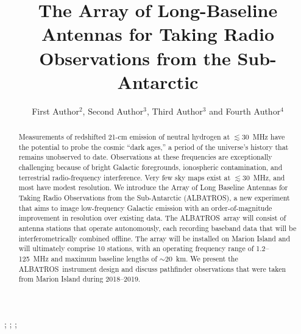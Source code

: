 \documentclass{ws-jai}
\def\albatros{ALBATROS}
\begin{document}
\catchline{}{}{}{}{} %


\title{The Array of Long-Baseline Antennas for Taking Radio
  Observations from the Sub-Antarctic}

\author{First Author$^{2}$, Second Author$^{3}$, Third Author$^{3}$ and Fourth Author$^{4}$}

\address{
$^{2}$Department, University Name, City, State ZIP/Zone, Country, fauthor@university.com\\
$^{3}$Group, Company, Address, City, State ZIP/Zone, Country\\
$^{4}$Group, Company, Address, City, State ZIP/Zone, Country, fauthor@company.com
}

\maketitle


\begin{history}
;
;
;
\end{history}

\begin{abstract}
Measurements of redshifted 21-cm emission of neutral hydrogen at
$\lesssim30$~MHz have the potential to probe the cosmic ``dark ages,''
a period of the universe's history that remains unobserved to date.
Observations at these frequencies are exceptionally challenging
because of bright Galactic foregrounds, ionospheric contamination, and
terrestrial radio-frequency interference.  Very few sky maps exist at
$\lesssim30$~MHz, and most have modest resolution.  We introduce the
Array of Long Baseline Antennas for Taking Radio Observations from the
Sub-Antarctic (\albatros), a new experiment that aims to image
low-frequency Galactic emission with an order-of-magnitude improvement
in resolution over existing data.  The \albatros\ array will consist
of antenna stations that operate autonomously, each recording baseband
data that will be interferometrically combined offline.  The array
will be installed on Marion Island and will ultimately comprise 10
stations, with an operating frequency range of 1.2--125~MHz and
maximum baseline lengths of $\sim20$~km.  We present the
\albatros\ instrument design and discuss pathfinder observations that
were taken from Marion Island during 2018--2019.
\end{abstract}
\end{document}
